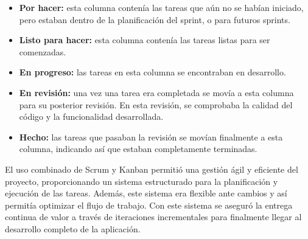 \begin{itemize}
    \item \textbf{Por hacer:} esta columna contenía las tareas que aún no se habían iniciado, pero estaban dentro de la planificación del sprint, o para futuros sprints.
    \item \textbf{Listo para hacer:} esta columna contenía las tareas listas para ser comenzadas.
    \item \textbf{En progreso:} las tareas en esta columna se encontraban en desarrollo. 
    \item \textbf{En revisión:} una vez una tarea era completada se movía a esta columna para su posterior revisión. En esta revisión, se comprobaba la calidad del código y la funcionalidad desarrollada. 
    \item \textbf{Hecho:} las tareas que pasaban la revisión se movían finalmente a esta columna, indicando así que estaban completamente terminadas. 
\end{itemize}

El uso combinado de Scrum y Kanban permitió una gestión ágil y eficiente del proyecto, proporcionando un sistema estructurado para la planificación y ejecución de las tareas. Además, este sistema era flexible ante cambios y así permitía optimizar el flujo de trabajo. Con este sistema se aseguró la entrega continua de valor a través de iteraciones incrementales para finalmente llegar al desarrollo completo de la aplicación.

